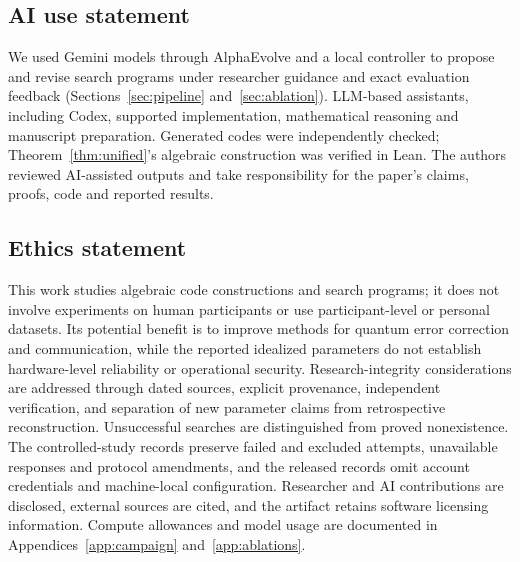 \subsection*{AI use statement}
We used Gemini models through AlphaEvolve and a local controller to
propose and revise search programs under researcher guidance and exact
evaluation feedback (Sections~\ref{sec:pipeline} and~\ref{sec:ablation}).
LLM-based assistants, including Codex, supported implementation,
mathematical reasoning and manuscript preparation. Generated codes were
independently checked; Theorem~\ref{thm:unified}'s algebraic construction
was verified in Lean. The authors reviewed AI-assisted outputs and take
responsibility for the paper's claims, proofs, code and reported results.

\subsection*{Ethics statement}
This work studies algebraic code constructions and search programs;
it does not involve experiments on human participants or use
participant-level or personal datasets. Its potential benefit is to
improve methods for quantum error correction and communication, while
the reported idealized parameters do not establish hardware-level
reliability or operational security. Research-integrity considerations
are addressed through dated sources, explicit provenance, independent
verification, and separation of new parameter claims from retrospective
reconstruction. Unsuccessful searches are distinguished from proved
nonexistence. The controlled-study records preserve failed and excluded
attempts, unavailable responses and protocol amendments, and the released
records omit account credentials and machine-local configuration.
Researcher and AI contributions are disclosed, external sources are
cited, and the artifact retains software licensing information. Compute
allowances and model usage are documented in Appendices~\ref{app:campaign}
and~\ref{app:ablations}.


